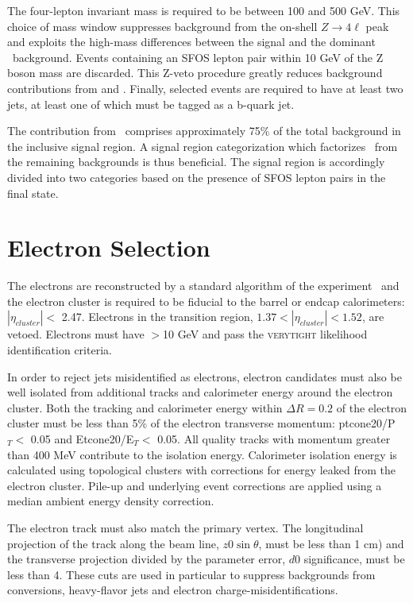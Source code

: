 The four-lepton invariant mass is required to be between 100 and 500 GeV. 
This choice of mass window suppresses background from the on-shell $Z\to4\ell$ peak and exploits the high-mass differences between the signal and the dominant \ttZ\ background. 
Events containing an SFOS lepton pair within 10 GeV of the Z boson mass are discarded. 
This Z-veto procedure greatly reduces background contributions from \ZZ and \ttZ. 
Finally, selected events are required to have at least two jets, at least one of which must be tagged as a b-quark jet.  

The contribution from \ttZ\ comprises approximately 75\% of the total background in the inclusive signal region. 
A signal region categorization which factorizes \ttZ\ from the remaining backgrounds is thus beneficial. 
The signal region is accordingly divided into two categories based on the presence of SFOS lepton pairs in the final state. 

\section{Electron Selection}

The electrons are reconstructed by a standard algorithm of the
experiment~\cite{ATLAS-CONF-2014-032} and the electron cluster is required to be fiducial 
to the barrel or endcap calorimeters: $|\eta_{cluster}| < $ 2.47. Electrons
in the transition region, $1.37 < |\eta_{cluster}| < 1.52$, are vetoed.
Electrons must have \pt$>$10 GeV and pass the \textsc{verytight} likelihood identification criteria.

In order to reject jets misidentified as electrons,
electron candidates  must also be well isolated from additional tracks and
calorimeter energy around the electron cluster. Both the tracking 
and calorimeter energy within $\Delta R=0.2$ of the electron
cluster must be less than 5\% of the electron transverse momentum: ptcone20/P$_T <$ 0.05 and Etcone20/E$_T <$ 0.05.
All quality tracks with momentum greater than 400 MeV contribute to the isolation
energy.  Calorimeter isolation energy is calculated
using topological clusters with corrections for energy leaked from the
electron cluster. Pile-up and underlying event corrections are applied using
a median ambient energy density correction.  

The electron track must also match the primary vertex. The longitudinal projection 
of the track along the beam line, $z0\sin{\theta}$, must be less than 1 cm) and the transverse projection divided by the
parameter error, $d0$ significance, must be less than 4. These cuts are used in particular to suppress backgrounds
from conversions, heavy-flavor jets and electron charge-misidentifications. 


